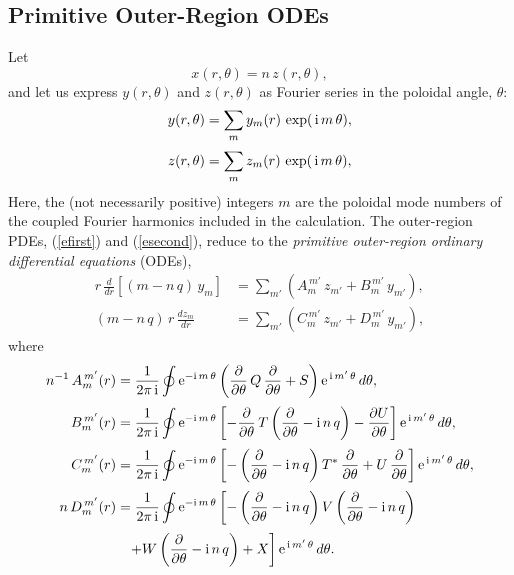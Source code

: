 \documentclass[12pt,prb,aps]{revtex4-1}
\begin{document}
\subsection{Primitive Outer-Region ODEs}\label{ode1}
Let
\begin{equation}\label{e79o}
x(r,\theta) = n\,z(r,\theta),
\end{equation}
and
let us express $y(r,\theta)$ and $z(r,\theta)$ as  Fourier series in the poloidal angle, $\theta$:
\begin{align}
y(r,\theta)&= \sum_{m}y_m(r)\,\exp(\,{\rm i}\,m\,\theta),\\[0.5ex]
z(r,\theta) &= \sum_{m}z_m(r)\,\exp(\,{\rm i}\,m\,\theta),\label{e97}
\end{align}
Here, the  (not necessarily positive) integers $m$ are the  poloidal mode numbers of the coupled Fourier harmonics included in the calculation. 
The outer-region PDEs, (\ref{efirst}) and (\ref{esecond}),  reduce to the {\em primitive outer-region ordinary differential equations}\/ 
(ODEs),\cite{connor,am1,am3}
\begin{align}\label{e41x}
r\,\frac{d}{dr}\left[(m-n\,q)\,y_m\right]&= \sum_{m'}\left(A_m^{\,m'}\,z_{m'}+B_m^{\,m'}\,y_{m'}\right),\\[0.5ex]
(m-n\,q)\,r\,\frac{dz_m}{dr} &= \sum_{m'}\left(C_{m}^{\,m'}\,z_{m'}+D_m^{\,m'}\,y_{m'}\right),\label{e42x}
\end{align}
where
\begin{align}
n^{-1}\,A_m^{\,m'}(r) &= \frac{1}{2\pi\,{\rm i}}\oint{\rm e}^{-{\rm i}\,m\,\theta}\left(\frac{\partial}{\partial\theta}\,Q\,\frac{\partial}{\partial\theta}+S\right){\rm e}^{\,{\rm i}\,m'\,\theta}\,d\theta,\\[0.5ex]
B_m^{\,m'}(r) &= \frac{1}{2\pi\,{\rm i}}\oint{\rm e}^{-{\rm i}\,m\,\theta}\left[-\frac{\partial}{\partial\theta}\,T\left(\frac{\partial}{\partial\theta}-{\rm i}\,n\,q\right)-\frac{\partial U}{\partial\theta}\right]{\rm e}^{\,{\rm i}\,m'\,\theta}\,d\theta,\\[0.5ex]
C_m^{\,m'}(r) &= \frac{1}{2\pi\,{\rm i}}\oint{\rm e}^{-{\rm i}\,m\,\theta}\left[-\left(\frac{\partial}{\partial\theta}-{\rm i}\,n\,q\right)T^\ast\,\frac{\partial}{\partial\theta}+U\,\frac{\partial}{\partial\theta}\right]{\rm e}^{\,{\rm i}\,m'\,\theta}\,d\theta,\\[0.5ex]
n\,D_m^{\,m'}(r)&= \frac{1}{2\pi\,{\rm i}}\oint{\rm e}^{-{\rm i}\,m\,\theta}\left[-\left(\frac{\partial}{\partial\theta}-{\rm i}\,n\,q\right)V\left(\frac{\partial}{\partial\theta}-{\rm i}\,n\,q\right)
\right. \nonumber\\[0.5ex]&\phantom{=}\left.+W\left(\frac{\partial}{\partial\theta}-{\rm i}\,n\,q\right)+ X\right]{\rm e}^{\,{\rm i}\,m'\,\theta}\,d\theta.
\end{align}
\end{document}
